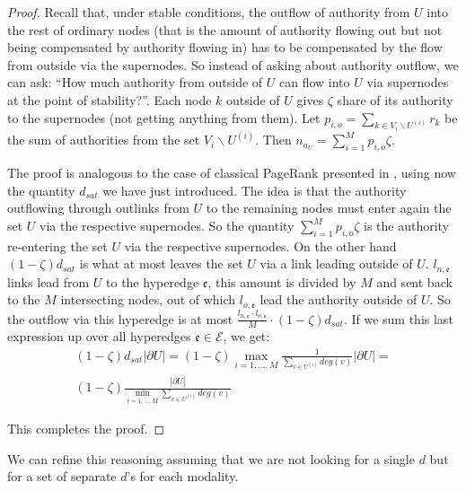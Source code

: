 \documentclass{fundam}
\newcommand{\HEM}{\mathcal{E}}
\newcommand{\hem}{\mathfrak{e}}
\newcommand{\N}{ V }
\begin{document}
\begin{proof}
Recall that, under stable conditions, the outflow of authority from $U$ into the rest of ordinary nodes (that is the amount of authority flowing out but not being compensated by authority flowing in) has to be compensated by the flow from outside via the supernodes. So instead of asking about authority outflow, we can ask:
``How much authority from outside of $U$ can flow into $U$ via supernodes at the point of stability?''. Each node $k$ outside of $U$ gives $\zeta$ share of its authority to the supernodes (not getting anything from them).
Let  $p_{i,o}=\sum_{k \in \N_i \backslash U^{(i)}}r_k$ be the sum of authorities from the set $\N_i \backslash U^{(i)}$.
Then $n_{a_U}=\sum_{i=1}^M p_{i,o}\zeta$.

\medskip
The proof  is analogous to the case of classical PageRank presented in \cite{Bipartite:2016}, using now the quantity $d_{sat}$ we have just introduced.
The idea is that the authority outflowing through outlinks from $U$ to the remaining nodes  must enter again the set $U$ via
the respective supernodes.
So the quantity $\sum_{i=1}^M  p_{i,o}\zeta$ is the authority   re-entering  the set $U$ via
the respective supernodes.
On the other hand $(1-\zeta)d_{sat}$  is what at most leaves the set $U$ via a link leading outside of $U$. $l_{n,\hem}$ links lead from $U$ to the hyperedge $\hem$, this amount is divided by $M$ and sent back to the $M$ intersecting nodes, out of which $l_{o,\hem}$ lead the authority outside of $U$.
So the outflow via this hyperedge is at most  $\frac{l_{n,\hem} \cdot  l_{o,\hem}}{M}\cdot (1-\zeta)d_{sat}$. If we sum this last expression up over all hyperedges $\hem \in \HEM$, we get:
\begin{eqnarray*}
& \displaystyle (1-\zeta)d_{sat}|\partial{U}|=
(1-\zeta)\max_{i=1,\dots ,M}\frac{1}{\sum_{v\in U^{(i)}} deg(v)}|\partial{U}|= &
\\[4pt]
& \displaystyle (1-\zeta)
\frac{|\partial{U}|}{\min_{i=1,\dots ,M}\sum_{v\in U^{(i)}} deg(v)}&
\end{eqnarray*}

This completes the proof.
\end{proof}
\eject

We can refine this reasoning assuming that we are not looking
for a single $d$ but for a set of separate $d$'s for each modality.
\end{document}
